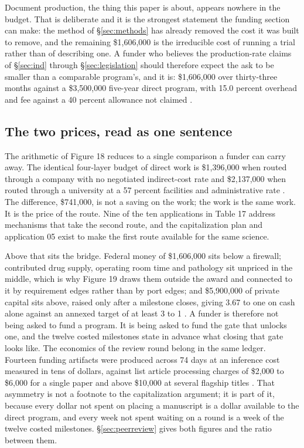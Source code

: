 Document production, the thing this paper is about, appears nowhere in the
budget. That is deliberate and it is the strongest statement the funding section
can make: the method of \S\ref{sec:methods} has already removed the cost it was
built to remove, and the remaining \$1,606,000 is the irreducible cost of
running a trial rather than of describing one. A funder who believes the
production-rate claims of \S\ref{sec:ind} through \S\ref{sec:legislation} should
therefore expect the ask to be smaller than a comparable program's, and it is:
\$1,606,000 over thirty-three months against a \$3,500,000 five-year direct
program, with 15.0 percent overhead and fee against a 40 percent allowance not
claimed \cite{capplan2026}.

\subsection{The two prices, read as one sentence}

The arithmetic of Figure 18 reduces to a single comparison a funder can carry
away. The identical four-layer budget of direct work is \$1,396,000 when routed
through a company with no negotiated indirect-cost rate and \$2,137,000 when
routed through a university at a 57 percent facilities and administrative rate
\cite{capplan2026}. The difference, \$741,000, is not a saving on the work; the
work is the same work. It is the price of the route. Nine of the ten
applications in Table 17 address mechanisms that take the second route, and the
capitalization plan and application 05 exist to make the first route available
for the same science.

Above that sits the bridge. Federal money of \$1,606,000 sits below a firewall;
contributed drug supply, operating room time and pathology sit unpriced in the
middle, which is why Figure 19 draws them outside the award and connected to it
by requirement edges rather than by port edges; and \$5,900,000 of private
capital sits above, raised only after a milestone closes, giving 3.67 to one on
cash alone against an annexed target of at least 3 to 1
\cite{capplan2026, kratsiosvought2026fy2028priorities}. A funder is therefore
not being asked to fund a program. It is being asked to fund the gate that
unlocks one, and the twelve costed milestones state in advance what closing that
gate looks like.
The economics of the review round belong in the same ledger. Fourteen funding
artifacts were produced across 74 days at an inference cost measured in tens of
dollars, against list article processing charges of \$2,000 to \$6,000 for a
single paper and above \$10,000 at several flagship titles
\cite{aiprgliomatc}. That asymmetry is not a footnote to the capitalization
argument; it is part of it, because every dollar not spent on placing a
manuscript is a dollar available to the direct program, and every week not spent
waiting on a round is a week of the twelve costed milestones.
\S\ref{sec:peerreview} gives both figures and the ratio between them.
